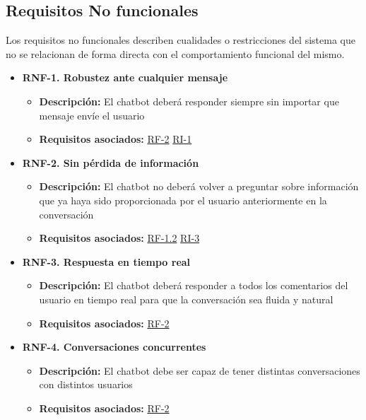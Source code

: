 \subsection{Requisitos No funcionales}

Los requisitos no funcionales describen cualidades o restricciones del sistema que no se relacionan de forma directa con el comportamiento funcional del mismo.

\begin{itemize}
    \item \textbf{RNF-1. Robustez ante cualquier mensaje} \label{RNF-1}
    \begin{itemize}
        \item \textbf{Descripción:} El chatbot deberá responder siempre sin importar que mensaje envíe el usuario
        \item \textbf{Requisitos asociados:} \hyperref[RF-2]{RF-2} \hyperref[RI-1]{RI-1}
    \end{itemize}
    
    \item \textbf{RNF-2. Sin pérdida de información} \label{RNF-2}
    \begin{itemize}
        \item \textbf{Descripción:} El chatbot no deberá volver a preguntar sobre información que ya haya sido proporcionada por el usuario anteriormente en la conversación
        \item \textbf{Requisitos asociados:} \hyperref[RF-1.2]{RF-1.2} \hyperref[RI-3]{RI-3}
    \end{itemize}
    
    \item \textbf{RNF-3. Respuesta en tiempo real} \label{RNF-3}
    \begin{itemize}
        \item \textbf{Descripción:} El chatbot deberá responder a todos los comentarios del usuario en tiempo real para que la conversación sea fluida y natural
        \item \textbf{Requisitos asociados:} \hyperref[RF-2]{RF-2}
    \end{itemize}
    
    \item \textbf{RNF-4. Conversaciones concurrentes} \label{RNF-4}
    \begin{itemize}
        \item \textbf{Descripción:} El chatbot debe ser capaz de tener distintas conversaciones con distintos usuarios
        \item \textbf{Requisitos asociados:} \hyperref[RF-2]{RF-2}
    \end{itemize}
    

\end{itemize}
